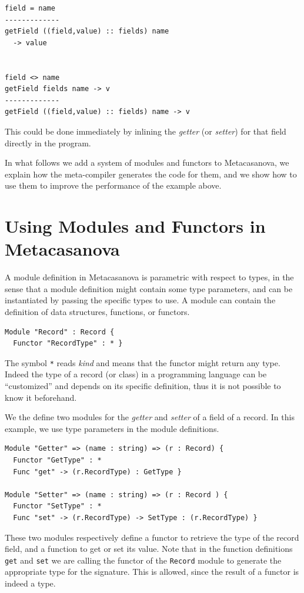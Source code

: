 \begin{lstlisting}
field = name
-------------
getField ((field,value) :: fields) name 
  -> value


field <> name
getField fields name -> v
-------------
getField ((field,value) :: fields) name -> v
\end{lstlisting}

\noindent
This could be done immediately by inlining the \textit{getter} (or \textit{setter}) for that field directly in the program.

In what follows we add a system of modules and functors to Metacasanova, we explain how the meta-compiler generates the code for them, and we show how to use them to improve the performance of the example above.

\section{Using Modules and Functors in Metacasanova}
\label{subsec:record_implementation}
A module definition in Metacasanova is parametric with respect to types, in the sense that a module definition might contain some type parameters, and can be instantiated by passing the specific types to use. A module can contain the definition of data structures, functions, or functors.

\begin{lstlisting}
Module "Record" : Record {
  Functor "RecordType" : * }
\end{lstlisting}

The symbol \texttt{*} reads \textit{kind} and means that the functor might return any type. Indeed the type of a record (or class) in a programming language can be ``customized'' and depends on its specific definition, thus it is not possible to know it beforehand.

We the define two modules for the \textit{getter} and \textit{setter} of a field of a record. In this example, we use type parameters in the module definitions.

\begin{lstlisting}
Module "Getter" => (name : string) => (r : Record) {
  Functor "GetType" : *
  Func "get" -> (r.RecordType) : GetType }
  
Module "Setter" => (name : string) => (r : Record ) {
  Functor "SetType" : *
  Func "set" -> (r.RecordType) -> SetType : (r.RecordType) }
\end{lstlisting}

\noindent
These two modules respectively define a functor to retrieve the type of the record field, and a function to get or set its value. Note that in the function definitions \texttt{get} and \texttt{set} we are calling the functor of the \texttt{Record} module to generate the appropriate type for the signature. This is allowed, since the result of a functor is indeed a type.

